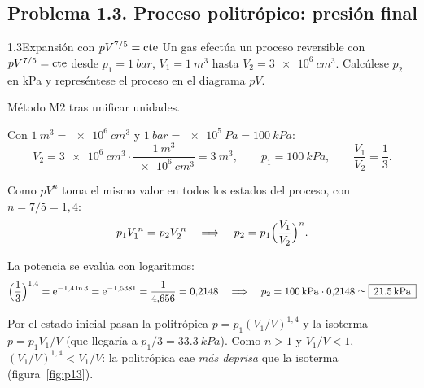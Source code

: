 \subsection{Problema 1.3. Proceso politrópico: presión final}
\begin{problema}{1.3}{Expansión con $pV^{7/5}=\mathrm{cte}$}
Un gas efectúa un proceso reversible con $pV^{7/5}=\mathrm{cte}$ desde $p_1=\SI{1}{bar}$, $V_1=\SI{1}{m^3}$
hasta $V_2=\SI{3e6}{cm^3}$. Calcúlese $p_2$ en kPa y represéntese el proceso en el diagrama $pV$.
\end{problema}

\begin{resolucion}
\idea Método M2 tras unificar unidades.

 Con $\SI{1}{m^3}=\SI{e6}{cm^3}$ y $\SI{1}{bar}=\SI{e5}{Pa}=\SI{100}{kPa}$:
\[
  V_2=\SI{3e6}{cm^3}\cdot\frac{\SI{1}{m^3}}{\SI{e6}{cm^3}}=\SI{3}{m^3},\qquad p_1=\SI{100}{kPa},\qquad
  \frac{V_1}{V_2}=\frac13.
\]

 Como $pV^n$ toma el mismo valor en todos los estados del proceso,
con $n=7/5=1{,}4$:
\[
  p_1V_1^{\,n}=p_2V_2^{\,n}\quad\Longrightarrow\quad p_2=p_1\Bigl(\frac{V_1}{V_2}\Bigr)^{n}.
\]

 La potencia se evalúa con logaritmos:
\[
  \Bigl(\frac13\Bigr)^{1{,}4}=\mathrm{e}^{-1{,}4\ln3}=\mathrm{e}^{-1{,}5381}=\frac{1}{4{,}656}=0{,}2148
  \quad\Longrightarrow\quad p_2=\SI{100}{kPa}\cdot0{,}2148\simeq\boxed{\,\SI{21,5}{kPa}\,}
\]

 Por el estado inicial pasan la politrópica $p=p_1(V_1/V)^{1{,}4}$ y la
isoterma $p=p_1V_1/V$ (que llegaría a $p_1/3=\SI{33,3}{kPa}$). Como $n>1$ y $V_1/V<1$,
$(V_1/V)^{1{,}4}<V_1/V$: la politrópica cae \emph{más deprisa} que la isoterma (figura~\ref{fig:p13}).
\end{resolucion}

